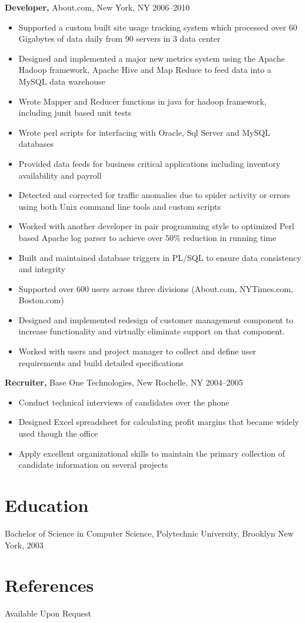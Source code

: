 \documentclass[margin]{res}
\begin{document}
\begin{resume}
{\bf Developer,} About.com, New York, NY \hfill  2006--2010
\begin{itemize}
  \item Supported a custom built site usage tracking system which processed over 60 Gigabytes of data daily from 90 servers in 3 data center
  \item Designed and implemented a major new metrics system using the Apache Hadoop framework, Apache Hive and Map Reduce to feed data into a MySQL data warehouse
  \item Wrote Mapper and Reducer functions in java for hadoop framework, including junit based unit tests
  \item Wrote perl scripts for interfacing with Oracle, Sql Server and MySQL databases
  \item Provided data feeds for business critical applications including inventory availability and payroll
  \item Detected and corrected for traffic anomalies due to spider activity or errors using both Unix command line tools and custom scripts
  \item Worked with another developer in pair programming style to optimized Perl based Apache log parser to achieve over 50\% reduction in running time
  \item Built and maintained database triggers in PL/SQL to ensure data consistency and integrity
  \item Supported over 600 users across three divisions (About.com, NYTimes.com, Boston.com)
  \item Designed and implemented redesign of customer management component to increase functionality and virtually eliminate support on that component.
  \item Worked with users and project manager to collect and define user requirements and build detailed specifications
\end{itemize}

{\bf Recruiter,} Base One Technologies, New Rochelle, NY \hfill 2004--2005
\begin{itemize}
  \item Conduct technical interviews of candidates over the phone
  \item Designed Excel spreadsheet for calculating profit margins that became widely used though the office
  \item Apply excellent organizational skills to maintain the primary collection of candidate information on several projects
\end{itemize}

\section{Education}
Bachelor of Science in Computer Science, Polytechnic University, Brooklyn New
York, 2003

\section{References}
Available Upon Request

\end{resume}
\end{document}

